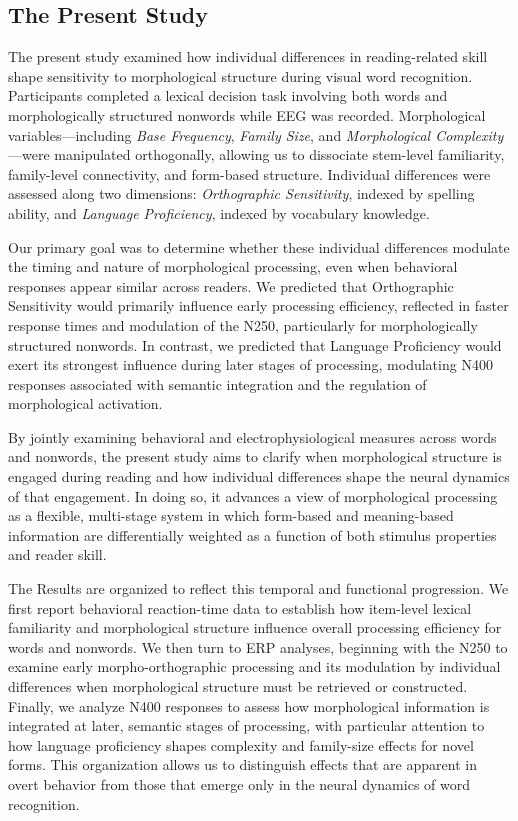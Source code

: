 \documentclass[preprint,12pt, authoryear, review]{elsarticle}
\begin{document}
\subsection{The Present Study}

The present study examined how individual differences in reading-related skill shape sensitivity to morphological structure during visual word recognition. Participants completed a lexical decision task involving both words and morphologically structured nonwords while EEG was recorded. Morphological variables—including \textit{Base Frequency}, \textit{Family Size}, and \textit{Morphological Complexity}—were manipulated orthogonally, allowing us to dissociate stem-level familiarity, family-level connectivity, and form-based structure. Individual differences were assessed along two dimensions: \textit{Orthographic Sensitivity}, indexed by spelling ability, and \textit{Language Proficiency}, indexed by vocabulary knowledge.

Our primary goal was to determine whether these individual differences modulate the timing and nature of morphological processing, even when behavioral responses appear similar across readers. We predicted that Orthographic Sensitivity would primarily influence early processing efficiency, reflected in faster response times and modulation of the N250, particularly for morphologically structured nonwords. In contrast, we predicted that Language Proficiency would exert its strongest influence during later stages of processing, modulating N400 responses associated with semantic integration and the regulation of morphological activation.

By jointly examining behavioral and electrophysiological measures across words and nonwords, the present study aims to clarify when morphological structure is engaged during reading and how individual differences shape the neural dynamics of that engagement. In doing so, it advances a view of morphological processing as a flexible, multi-stage system in which form-based and meaning-based information are differentially weighted as a function of both stimulus properties and reader skill.

The Results are organized to reflect this temporal and functional progression. We first report behavioral reaction-time data to establish how item-level lexical familiarity and morphological structure influence overall processing efficiency for words and nonwords. We then turn to ERP analyses, beginning with the N250 to examine early morpho-orthographic processing and its modulation by individual differences when morphological structure must be retrieved or constructed. Finally, we analyze N400 responses to assess how morphological information is integrated at later, semantic stages of processing, with particular attention to how language proficiency shapes complexity and family-size effects for novel forms. This organization allows us to distinguish effects that are apparent in overt behavior from those that emerge only in the neural dynamics of word recognition.
\end{document}
